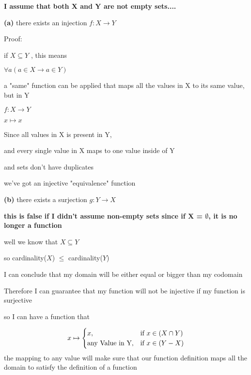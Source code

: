 \documentclass[12pts,A4]{article}
\begin{document}
\begin{flushleft}
    
    \textbf{I assume that both X and Y are not empty sets....}


    \textbf{(a)} there exists an injection $f : X \rightarrow Y$
    \bigskip

    Proof:

    if $ X \subseteq Y$ , this means 
    
    $ \forall a ( a \in X \rightarrow a \in Y) $

    a "same" function can be applied that maps all the values in X to its same value, but in Y

    \bigskip
     $f : X \rightarrow Y$
    
     $ x \mapsto x$ 
    
    \bigskip

    Since all values in X is present in Y,
    
    and every single value in X maps to one value inside of Y
   
    and sets don't have duplicates

    we've got an injective "equivalence" function

    \bigskip
    \bigskip

    

    \textbf{(b)} there exists a surjection $g : Y \rightarrow X$

    \textbf{this is false if I didn't assume non-empty sets since if X = $\emptyset$, it is no longer a function}

    \bigskip

    \bigskip

    well we know that $X \subseteq Y$

    so cardinality($X$) $\leq$ cardinality($Y$)
    
    I can conclude that my domain will be either equal or bigger than my codomain

    Therefore I can guarantee that my function will not be injective if my function is surjective
    \bigskip

    so  I can have a  function that 


    \begin{equation}
        x \mapsto \begin{cases}
            x,& \text{if $ x \in (X \cap Y)$}\\
            \text{any Value in Y}, & \text{if } x \in (Y - X)
        \end{cases}
    \end{equation}
   \bigskip 
    the mapping to any value will make sure that our function definition maps all the domain to satisfy the definition of a function

\end{flushleft}
\end{document}
